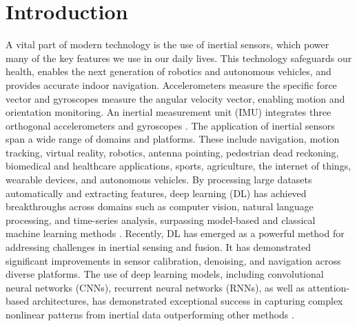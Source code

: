 \documentclass[journal]{IEEEtran}
\begin{document}
\section{Introduction}
A vital part of modern technology is the use of inertial sensors, which power many of the key features we use in our daily lives. This technology safeguards our health, enables the next generation of robotics and autonomous vehicles, and provides accurate indoor navigation. Accelerometers measure the specific force vector and gyroscopes measure the angular velocity vector, enabling motion and orientation monitoring. An inertial measurement unit (IMU) integrates three orthogonal accelerometers and gyroscopes \cite{groves}. The application of inertial sensors span a wide range of domains and platforms. These include navigation, motion tracking, virtual reality, robotics, antenna pointing, pedestrian dead reckoning, biomedical and healthcare applications, sports, agriculture, the internet of things, wearable devices, and autonomous vehicles. 
\noindent 
By processing large datasets automatically and extracting features, deep learning (DL) has achieved breakthroughs across domains such as computer vision, natural language processing, and time-series analysis, surpassing model-based and classical machine learning methods \cite{sarker2021deep, malhotra2023recent}. Recently, DL has emerged as a powerful method for addressing challenges in inertial sensing and fusion. It has demonstrated significant improvements in sensor calibration, denoising, and navigation across diverse platforms. The use of deep learning models, including convolutional neural networks (CNNs), recurrent neural networks (RNNs), as well as attention-based architectures, has demonstrated exceptional success in capturing complex nonlinear patterns from inertial data outperforming other methods \cite {cohen2024inertial, klein2022data, chen2024deep}. \\
\noindent 
\end{document}
